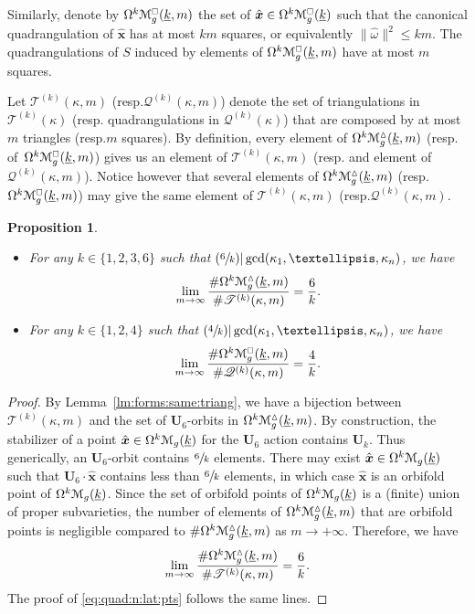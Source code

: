 \documentclass[11pt]{article}
\newcommand{\resp}{resp.\xspace}
\newcommand{\skpt}{\smallskip}
\numberwithin{equation}{section}
\let\mathcal\EuScript
\newcommand{\Psfrac}[2]{(\sfrac{#1}{#2})}
\theoremstyle{plain}
\newtheorem{Proposition}[Theorem]{Proposition}
\theoremstyle{definition}
\newcommand{\Ub}{\mathbf{U}}
\newcommand{\Mcal}{\mathcal{M}}
\newcommand{\QQ}{\mathscr{Q}}
\newcommand{\TT}{\mathscr{T}}
\newcommand{\homg}{\hat{\omega}}
\newcommand{\hxx}{\hat{\boldsymbol{x}}}
\let\ul\underline
\newcommand{\Skdiff}{\Omega^k\mathcal{M}_{g}(\ul{k})}
\newcommand{\Qkdiff}{\Omega^k\Mcal^{\scriptscriptstyle\square}_g(\ul{k})}
\newcommand{\Tkdiffm}{\Omega^k\Mcal^\vartriangle_g(\ul{k},m)}
\newcommand{\Qkdiffm}{\Omega^k\Mcal^{\scriptscriptstyle\square}_g(\ul{k},m)}
\begin{document}
Similarly, denote by $\Qkdiffm$ the set of $\hxx\in \Qkdiff$ such that the canonical quadrangulation of $\hxx$ has at most $km$ squares, or equivalently $\|\homg\|^2 \leq km$. The quadrangulations of $S$ induced by elements of $\Qkdiffm$ have at most $m$ squares.

Let $\TT^{(k)}(\kappa,m)$ (\resp $\QQ^{(k)}(\kappa,m)$) denote the set of triangulations in $\TT^{(k)}(\kappa)$ (\resp quadrangulations in $\QQ^{(k)}(\kappa)$) that are composed by at most $m$ triangles (\resp $m$ squares). By definition, every element of $\Tkdiffm$ (\resp of~$\Qkdiffm$) gives us an element of $\TT^{(k)}(\kappa,m)$ (\resp and element of $\QQ^{(k)}(\kappa,m)$). Notice however that several elements of $\Tkdiffm$ (\resp $\Qkdiffm$) may give the same element of $\TT^{(k)}(\kappa,m)$ (\resp $\QQ^{(k)}(\kappa,m)$.

\skpt
\begin{Proposition}\label{prop:triang:n:lat:pts}
\begin{itemize}
\item
For any $k \in \{1,2,3,6\}$ such that $\Psfrac{6}{k} | \gcd(\kappa_1,\dots,\kappa_n)$, we have%
\begin{equation}\label{eq:triang:n:lat:pts}
\lim_{m\to \infty}\frac{\#\Tkdiffm}{\#\TT^{(k)}(\kappa,m)}=\frac{6}{k}.
\end{equation}

\item
For any $k\in \{1,2,4\}$ such that $\Psfrac{4}{k} | \gcd(\kappa_1,\dots,\kappa_n)$, we have
\begin{equation}\label{eq:quad:n:lat:pts}
\lim_{m\to \infty}\frac{\#\Qkdiffm}{\#\QQ^{(k)}(\kappa,m)}=\frac{4}{k}.
\end{equation}
\end{itemize}
\end{Proposition}

\begin{proof}
By Lemma~\ref{lm:forms:same:triang}, we have a bijection between $\TT^{(k)}(\kappa,m)$ and the set of $\Ub_6$\nobreakdash-orbits in $\Tkdiffm$.
By construction, the stabilizer of a point $\hxx\in \Skdiff$ for the $\Ub_6$ action contains $\Ub_k$. Thus generically, an $\Ub_6$-orbit contains $\sfrac{6}{k}$ elements. There may exist $\hxx\in \Skdiff$ such that $\Ub_6\cdot\hxx$ contains less than $\sfrac{6}{k}$ elements, in which case $\hxx$ is an orbifold point of $\Skdiff$. Since the set of orbifold points of $\Skdiff$ is a (finite) union of proper subvarieties, the number of elements of $\Tkdiffm$ that are orbifold points is negligible compared to $\#\Tkdiffm$ as $m\to +\infty$. Therefore, we have
\[
\lim_{m\to \infty}\frac{\#\Tkdiffm}{\#\TT^{(k)}(\kappa,m)}=\frac{6}{k}.
\]
The proof of \eqref{eq:quad:n:lat:pts} follows the same lines.
\end{proof}
\end{document}
